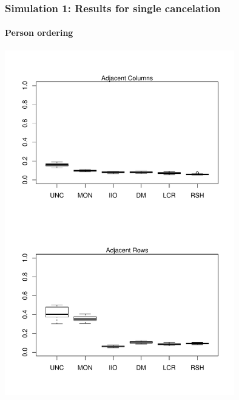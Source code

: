 \documentclass[10pt,serif,professionalfont]{beamer}
\begin{document}
\begin{frame}
    \frametitle{Simulation 1: Results for single cancelation}
        \framesubtitle{Person ordering}

    \centering \includegraphics[width=0.75\textwidth, clip, trim = 0 4.5in 0 0]{./figs/boxplots_single.pdf}

\end{frame}
\end{document}
